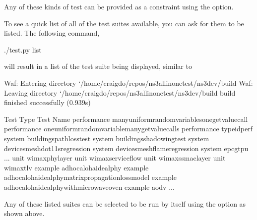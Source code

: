 \documentclass[letterpaper,10pt,english]{sphinxmanual}
\renewcommand{\sphinxcode}[1]{\texttt{\small{#1}}}
\begin{document}
Any of these kinds of test can be provided as a constraint using the \sphinxcode{\sphinxupquote{\sphinxhyphen{}\sphinxhyphen{}constraint}}
option.

To see a quick list of all of the test suites available, you can ask for them
to be listed.  The following command,

\begin{sphinxVerbatim}[commandchars=\\\{\}]
\PYGZdl{} ./test.py \PYGZhy{}\PYGZhy{}list
\end{sphinxVerbatim}

will result in a list of the test suite being displayed, similar to

\begin{sphinxVerbatim}[commandchars=\\\{\}]
Waf: Entering directory `/home/craigdo/repos/ns\PYGZhy{}3\PYGZhy{}allinone\PYGZhy{}test/ns\PYGZhy{}3\PYGZhy{}dev/build\PYGZsq{}
Waf: Leaving directory `/home/craigdo/repos/ns\PYGZhy{}3\PYGZhy{}allinone\PYGZhy{}test/ns\PYGZhy{}3\PYGZhy{}dev/build\PYGZsq{}
\PYGZsq{}build\PYGZsq{} finished successfully (0.939s)

Test Type    Test Name
\PYGZhy{}\PYGZhy{}\PYGZhy{}\PYGZhy{}\PYGZhy{}\PYGZhy{}\PYGZhy{}\PYGZhy{}\PYGZhy{}    \PYGZhy{}\PYGZhy{}\PYGZhy{}\PYGZhy{}\PYGZhy{}\PYGZhy{}\PYGZhy{}\PYGZhy{}\PYGZhy{}
performance  many\PYGZhy{}uniform\PYGZhy{}random\PYGZhy{}variables\PYGZhy{}one\PYGZhy{}get\PYGZhy{}value\PYGZhy{}call
performance  one\PYGZhy{}uniform\PYGZhy{}random\PYGZhy{}variable\PYGZhy{}many\PYGZhy{}get\PYGZhy{}value\PYGZhy{}calls
performance  type\PYGZhy{}id\PYGZhy{}perf
system       buildings\PYGZhy{}pathloss\PYGZhy{}test
system       buildings\PYGZhy{}shadowing\PYGZhy{}test
system       devices\PYGZhy{}mesh\PYGZhy{}dot11s\PYGZhy{}regression
system       devices\PYGZhy{}mesh\PYGZhy{}flame\PYGZhy{}regression
system       epc\PYGZhy{}gtpu
...
unit         wimax\PYGZhy{}phy\PYGZhy{}layer
unit         wimax\PYGZhy{}service\PYGZhy{}flow
unit         wimax\PYGZhy{}ss\PYGZhy{}mac\PYGZhy{}layer
unit         wimax\PYGZhy{}tlv
example      adhoc\PYGZhy{}aloha\PYGZhy{}ideal\PYGZhy{}phy
example      adhoc\PYGZhy{}aloha\PYGZhy{}ideal\PYGZhy{}phy\PYGZhy{}matrix\PYGZhy{}propagation\PYGZhy{}loss\PYGZhy{}model
example      adhoc\PYGZhy{}aloha\PYGZhy{}ideal\PYGZhy{}phy\PYGZhy{}with\PYGZhy{}microwave\PYGZhy{}oven
example      aodv
...
\end{sphinxVerbatim}

Any of these listed suites can be selected to be run by itself using the
\sphinxcode{} option as shown above.
\end{document}
